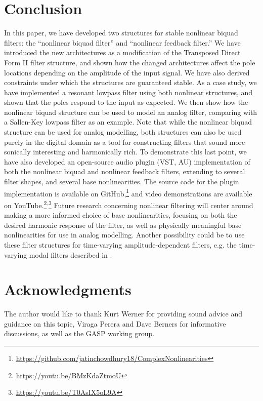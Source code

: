 \documentclass[twoside,a4paper]{article}
\begin{document}
\section{Conclusion}

In this paper, we have developed two structures for stable nonlinear biquad
filters: the ``nonlinear biquad filter'' and ``nonlinear feedback filter.''
We have introduced the new architectures as a modification of the
Transposed Direct Form II filter structure, and shown
how the changed architectures affect the pole locations depending on
the amplitude of the input signal. We have also derived constraints under
which the structures are guaranteed stable.
\newline\newline
As a case study, we have implemented a resonant lowpass filter using
both nonlinear structures, and shown that the poles respond to the input
as expected. We then show how the nonlinear biquad structure can be used
to model an analog filter, comparing with a Sallen-Key lowpass filter as
an example. Note that while the nonlinear biquad structure
can be used for analog modelling, both structures can also be
used purely in the digital domain as a tool for constructing
filters that sound more sonically interesting and harmonically
rich.
\newline\newline
To demonstrate this last point, we have also developed an open-source
audio plugin (VST, AU) implementation of both the nonlinear biquad and
nonlinear feedback filters, extending to several filter shapes, and
several base nonlinearities.
The source code for the plugin implementation is available on
GitHub,\footnote{\url{https://github.com/jatinchowdhury18/ComplexNonlinearities}}
and video demonstrations are available on
YouTube.\footnote{\url{https://youtu.be/BMzKdaZtmoU}}$^{,}$\footnote{\url{https://youtu.be/T0AsIX5oL9A}}
\newline\newline
Future research concerning nonlinear filtering will center around making a
more informed choice of base nonlinearities, focusing on both the desired
harmonic response of the filter, as well as physically meaningful base
nonlinearities for use in analog modelling. Another possibility could be
to use these filter structures for time-varying amplitude-dependent
filters, e.g. the time-varying modal filters described in \cite{mark-nlmodal}.

\section{Acknowledgments}

The author would like to thank Kurt Werner for providing sound advice and
guidance on this topic, Viraga Perera and Dave Berners for informative
discussions, as well as the GASP working group.

\nocite{*}


\end{document}
